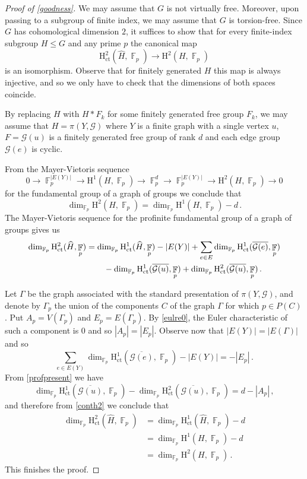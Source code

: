 \documentclass[a4paper]{amsart}
\theoremstyle{definition}
\theoremstyle{remark}
\DeclareMathOperator{\bbf}{\mathbb{F}}
\newcommand{\G}{\mathcal G}
\newcommand{\HH}{\mathrm{H}}
\begin{document}
\begin{proof}[Proof of \cref{goodness}] We may assume that \(G\) is not virtually free. Moreover, upon passing to a subgroup of finite index, we may assume that \(G\) is torsion-free. Since \(G\) has cohomological dimension \(2\), it suffices to show that for every finite-index subgroup \(H \leq G\) and any prime \(p\) the canonical map \[\HH_{\mathrm{ct}}^2(\widehat{H}, \bbf_p) \to \HH^2(H,\bbf_p)\] is an isomorphism. Observe that for finitely generated \(H\) this map is always injective, and so we only have to check that the dimensions of both spaces coincide.

By replacing \(H\) with \(H*F_k\) for some finitely generated free group \(F_k\), we may assume that \(H = \pi(Y,\G)\) where \(Y\) is a finite graph with a single vertex \(u\), \(F = \G(u)\) is a finitely generated free group of rank \(d\) and each edge group \(\G(e)\) is cyclic.

From the Mayer-Vietoris sequence
\[0 \to \bbf_p^{|E(Y)|} \to \HH^1(H,\bbf_p) \to \bbf_p^d \to \bbf_p^{|E(Y)|} \to \HH^2(H,\bbf_p) \to 0\]
for the fundamental group of a graph of groups we conclude that \[\dim_{\bbf_p} \HH^2(H,\bbf_p) = \dim_{\bbf_p} \HH^1(H,\bbf_p) - d\,.\] The Mayer-Vietoris sequence for the profinite fundamental group of a graph of groups gives us
\begin{equation}\label{conth2}
    \begin{split}
        \dim_{\bbf_p} \HH^2_{\mathrm{ct}}(\widehat{H},\bbf_p) &= \dim_{\bbf_p} \HH^1_{\mathrm{ct}}(\widehat{H},\bbf_p) - |E(Y)| + \sum_{e \in E} \dim_{\bbf_p} \HH^1_{\mathrm{ct}}(\overline{\G(e)},\bbf_p)\\
        &\hphantom{aaaa} -\dim_{\bbf_p} \HH^1_{\mathrm{ct}}(\overline{\G(u)},\bbf_p) + \dim_{\bbf_p} \HH^2_{\mathrm{ct}}(\overline{\G(u)},\bbf_p)\,.
    \end{split}
\end{equation}

Let \(\Gamma\) be the graph associated with the standard presentation of \(\pi(Y,\G)\), and denote by \(\Gamma_p\) the union of the components \(C\) of the graph \(\Gamma\) for which \(p \in P(C)\). Put \(A_p = V(\Gamma_p)\) and \(E_p = E(\Gamma_p)\). By \cref{eulre0}, the Euler characteristic of such a component is \(0\) and so \(|A_p| = |E_p|\). Observe now that \(|E(Y)| = |E(\Gamma)|\) and so \[\sum_{e \in E(Y)} \dim_{\bbf_p} \HH^1_{\mathrm{ct}}(\overline{\G(e)},\bbf_p) - |E(Y)| = -|E_p|\,.\] From \cref{profpresent} we have \[\dim_{\bbf_p} \HH^1_{\mathrm{ct}}(\overline{\G(u)},\bbf_p) - \dim_{\bbf_p} \HH^2_{\mathrm{ct}}(\overline{\G(u)},\bbf_p) = d - |A_p|\,,\] and therefore from \cref{conth2} we conclude that 
\begin{align*}
    \dim_{\bbf_p} \HH^2_{\mathrm{ct}}(\widehat{H},\bbf_p) &= \dim_{\bbf_p} \HH^1_{\mathrm{ct}}(\widehat{H},\bbf_p) - d\\
    &= \dim_{\bbf_p} \HH^1(H,\bbf_p) - d\\
    &= \dim_{\bbf_p} \HH^2(H,\bbf_p)\,.
\end{align*}
This finishes the proof.
\end{proof}
\end{document}
